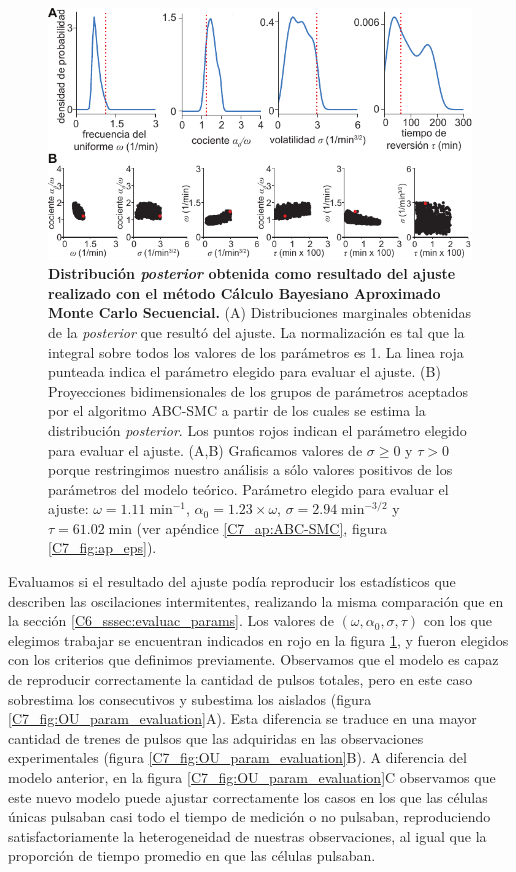 \documentclass[./main.tex]{subfiles}
\begin{document}
\begin{figure}
    \centering
    \includegraphics[width=1\columnwidth]{figures/chapter7/C7_OU_fit.pdf} 
    \caption{\textbf{Distribución \textit{posterior} obtenida como resultado del ajuste realizado con el método Cálculo Bayesiano Aproximado Monte Carlo Secuencial.} (A) Distribuciones marginales obtenidas de la \textit{posterior} que resultó del ajuste. La normalización es tal que la integral sobre todos los valores de los parámetros es 1. La linea roja punteada indica el parámetro elegido para evaluar el ajuste. (B) Proyecciones bidimensionales de los grupos de parámetros aceptados por el algoritmo ABC-SMC a partir de los cuales se estima la distribución \textit{posterior}. Los puntos rojos indican el parámetro elegido para evaluar el ajuste. (A,B) Graficamos valores de $\sigma \geq 0$ y $\tau > 0$ porque restringimos nuestro análisis a sólo valores positivos de los parámetros del modelo teórico. Parámetro elegido para evaluar el ajuste: $\omega = 1.11\; \text{min}^{-1}$, $\alpha_0 = 1.23 \times \omega$, $ \sigma = 2.94 \;  \text{min}^{-3/2}$ y $\tau = 61.02 \; \text{min} $ (ver apéndice \ref{C7_ap:ABC-SMC}, figura \ref{C7_fig:ap_eps}).}
    \label{C7_fig:OU_fit}
\end{figure} 


Evaluamos si el resultado del ajuste podía reproducir los estadísticos que describen las oscilaciones intermitentes, realizando la misma comparación que en la sección \ref{C6_sssec:evaluac_params}. Los valores de $(\omega,\alpha_0,\sigma,\tau)$ con los que elegimos trabajar se encuentran indicados en rojo en la figura \ref{C7_fig:OU_fit}, y fueron elegidos con los criterios que definimos previamente. Observamos que el modelo es capaz de reproducir correctamente la cantidad de pulsos totales, pero en este caso sobrestima los consecutivos y subestima los aislados (figura \ref{C7_fig:OU_param_evaluation}A). Esta diferencia se traduce en una mayor cantidad de trenes de pulsos que las adquiridas en las observaciones experimentales (figura \ref{C7_fig:OU_param_evaluation}B). A diferencia del modelo anterior, en la figura \ref{C7_fig:OU_param_evaluation}C observamos que este nuevo modelo puede ajustar correctamente los casos en los que las células únicas pulsaban casi todo el tiempo de medición o no pulsaban, reproduciendo satisfactoriamente la heterogeneidad de nuestras observaciones, al igual que la proporción de tiempo promedio en que las células pulsaban.
\end{document}
